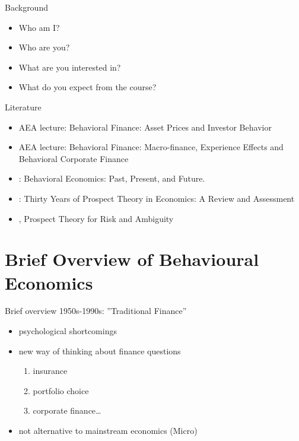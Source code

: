\documentclass[11pt, aspectratio=169]{beamer}
\begin{document}
\begin{frame}{Background}
    \begin{itemize}
        \item Who am I?\bigskip
        \item Who are you?\bigskip
        \item What are you interested in?\bigskip
        \item What do you expect from the course?\bigskip
    \end{itemize}
\end{frame}





\begin{frame}{Literature}
    \begin{itemize}
        \item \citet{Barberis2017Talk} AEA lecture: Behavioral Finance: Asset Prices and Investor Behavior\bigskip
        \item \citet{Malmendier2017Talk} AEA lecture: Behavioral Finance: Macro-finance, Experience Effects and Behavioral Corporate Finance\bigskip
        \item \citet{Thaler2016}:  Behavioral Economics: Past, Present, and Future.\bigskip
        \item \citet{Barberis2013a}: Thirty Years of Prospect Theory in Economics: A Review and Assessment\bigskip
        \item \citet{Wakker2010}, Prospect Theory for Risk and Ambiguity\bigskip
	\end{itemize}
\end{frame}

\section{Brief Overview of Behavioural Economics}
\begin{frame}{Brief overview}
    1950s-1990s: ''Traditional Finance''\bigskip
\begin{itemize}
	\item psychological shortcomings \bigskip
    \item new way of thinking about finance questions\bigskip
        \begin{enumerate}
            \item insurance\medskip
            \item portfolio choice\medskip
            \item corporate finance\ldots
            \medskip
        \end{enumerate}
    \item not alternative to mainstream economics (Micro)\bigskip
\end{itemize}
\end{frame}
\end{document}
